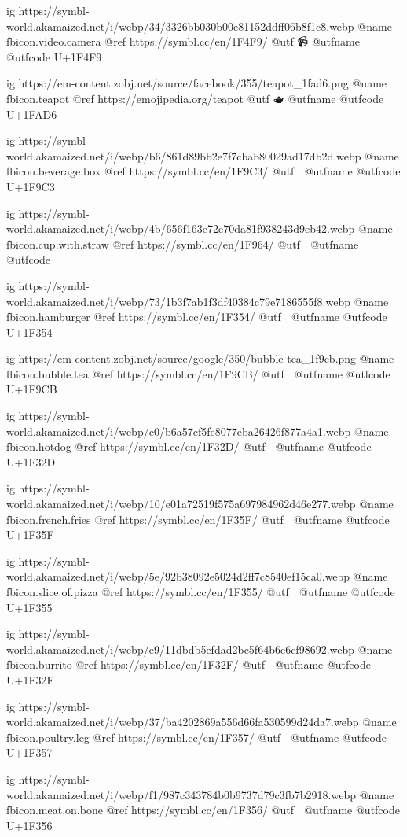 	ig https://symbl-world.akamaized.net/i/webp/34/3326bb030b00e81152ddff06b8f1c8.webp
	@name fbicon.video.camera
	@ref https://symbl.cc/en/1F4F9/
	@utf 📹
	@utfname
	@utfcode U+1F4F9

	ig https://em-content.zobj.net/source/facebook/355/teapot_1fad6.png
	@name fbicon.teapot
	@ref https://emojipedia.org/teapot
	@utf 🫖
	@utfname
	@utfcode U+1FAD6

	ig https://symbl-world.akamaized.net/i/webp/b6/861d89bb2e7f7cbab80029ad17db2d.webp
	@name fbicon.beverage.box
	@ref https://symbl.cc/en/1F9C3/
	@utf 🧃
	@utfname
	@utfcode U+1F9C3

	ig https://symbl-world.akamaized.net/i/webp/4b/656f163e72e70da81f938243d9eb42.webp
	@name fbicon.cup.with.straw
	@ref https://symbl.cc/en/1F964/
	@utf 🥤
	@utfname
	@utfcode

	ig https://symbl-world.akamaized.net/i/webp/73/1b3f7ab1f3df40384c79e7186555f8.webp
	@name fbicon.hamburger
	@ref https://symbl.cc/en/1F354/
	@utf 🍔
	@utfname
	@utfcode U+1F354

	ig https://em-content.zobj.net/source/google/350/bubble-tea_1f9cb.png
	@name fbicon.bubble.tea
	@ref https://symbl.cc/en/1F9CB/
	@utf 🧋
	@utfname
	@utfcode U+1F9CB

	ig https://symbl-world.akamaized.net/i/webp/c0/b6a57cf5fe8077eba26426f877a4a1.webp
	@name fbicon.hotdog
	@ref https://symbl.cc/en/1F32D/
	@utf 🌭
	@utfname
	@utfcode U+1F32D

	ig https://symbl-world.akamaized.net/i/webp/10/e01a72519f575a697984962d46e277.webp
	@name fbicon.french.fries
	@ref https://symbl.cc/en/1F35F/
	@utf 🍟
	@utfname
	@utfcode U+1F35F

	ig https://symbl-world.akamaized.net/i/webp/5e/92b38092e5024d2ff7c8540ef15ca0.webp
	@name fbicon.slice.of.pizza
	@ref https://symbl.cc/en/1F355/
	@utf 🍕
	@utfname
	@utfcode U+1F355

	ig https://symbl-world.akamaized.net/i/webp/e9/11dbdb5efdad2bc5f64b6e6cf98692.webp
	@name fbicon.burrito
	@ref https://symbl.cc/en/1F32F/
	@utf 🌯
	@utfname
	@utfcode U+1F32F

	ig https://symbl-world.akamaized.net/i/webp/37/ba4202869a556d66fa530599d24da7.webp
	@name fbicon.poultry.leg
	@ref https://symbl.cc/en/1F357/
	@utf 🍗
	@utfname
	@utfcode U+1F357

	ig https://symbl-world.akamaized.net/i/webp/f1/987c343784b0b9737d79c3fb7b2918.webp
	@name fbicon.meat.on.bone
	@ref https://symbl.cc/en/1F356/
	@utf 🍖
	@utfname
	@utfcode U+1F356

